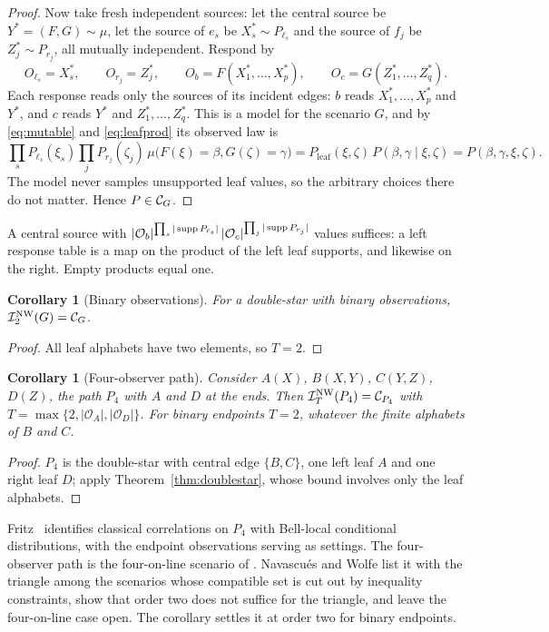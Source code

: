 \documentclass[11pt]{article}
\theoremstyle{plain}
\newtheorem{corollary}[theorem]{Corollary}
\theoremstyle{definition}
\newcommand{\INW}{\mathcal I^{\mathrm{NW}}}
\begin{document}
\begin{proof}
Now take fresh independent sources: let the central source be $Y^*=(F,G)\sim\mu$, let the source of $e_s$ be $X_s^*\sim P_{\ell_s}$ and the source of $f_j$ be $Z_j^*\sim P_{r_j}$, all mutually independent. Respond by
\[
O_{\ell_s}=X_s^*,\qquad O_{r_j}=Z_j^*,\qquad O_b=F(X_1^*,\dots,X_p^*),\qquad O_c=G(Z_1^*,\dots,Z_q^*).
\]
Each response reads only the sources of its incident edges: $b$ reads $X_1^*,\dots,X_p^*$ and $Y^*$, and $c$ reads $Y^*$ and $Z_1^*,\dots,Z_q^*$. This is a model for the scenario $G$, and by \eqref{eq:mutable} and \eqref{eq:leafprod} its observed law is
\[
\prod_sP_{\ell_s}(\xi_s)\prod_jP_{r_j}(\zeta_j)\,\mu\bigl(F(\xi)=\beta,G(\zeta)=\gamma\bigr)
=P_{\mathrm{leaf}}(\xi,\zeta)\,P(\beta,\gamma\mid\xi,\zeta)=P(\beta,\gamma,\xi,\zeta).
\]
The model never samples unsupported leaf values, so the arbitrary choices there do not matter. Hence $P\in\mathcal C_{G}$.
\end{proof}

A central source with
\(
|\mathcal O_b|^{\prod_s|\operatorname{supp} P_{\ell_s}|}\,|\mathcal O_c|^{\prod_j|\operatorname{supp} P_{r_j}|}
\)
values suffices: a left response table is a map on the product of the left leaf supports, and likewise on the right. Empty products equal one.

\begin{corollary}[Binary observations]\label{cor:doublestarbinary}
For a double-star with binary observations, $\INW_2(G)=\Cscen{G}$.
\end{corollary}

\begin{proof}
All leaf alphabets have two elements, so $T=2$.
\end{proof}

\begin{corollary}[Four-observer path]\label{cor:path}
Consider $A(X)$, $B(X,Y)$, $C(Y,Z)$, $D(Z)$, the path $P_4$ with $A$ and $D$ at the ends. Then $\INW_T(P_4)=\Cscen{P_4}$ with $T=\max\{2,|\mathcal O_A|,|\mathcal O_D|\}$. For binary endpoints $T=2$, whatever the finite alphabets of $B$ and $C$.
\end{corollary}

\begin{proof}
$P_4$ is the double-star with central edge $\{B,C\}$, one left leaf $A$ and one right leaf $D$; apply Theorem~\ref{thm:doublestar}, whose bound involves only the leaf alphabets.
\end{proof}
Fritz~\cite[Theorem~2.4]{Fritz2012} identifies classical correlations on $P_4$ with Bell-local conditional distributions, with the endpoint observations serving as settings. The four-observer path is the four-on-line scenario of \cite[Figure~8]{NW2020}. Navascu\'es and Wolfe list it with the triangle among the scenarios whose compatible set is cut out by inequality constraints, show that order two does not suffice for the triangle, and leave the four-on-line case open. The corollary settles it at order two for binary endpoints.
\end{document}
